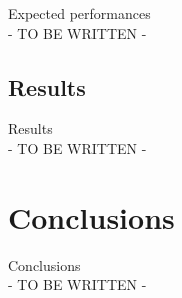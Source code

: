 \documentclass[11pt]{article}
\begin{document}
            Expected performances \\
            - TO BE WRITTEN -

        \subsection{Results} \label{subsec:results}

            Results \\
            - TO BE WRITTEN -

    \section{Conclusions} \label{sec:conclusions}

        Conclusions \\
        - TO BE WRITTEN -
\end{document}

